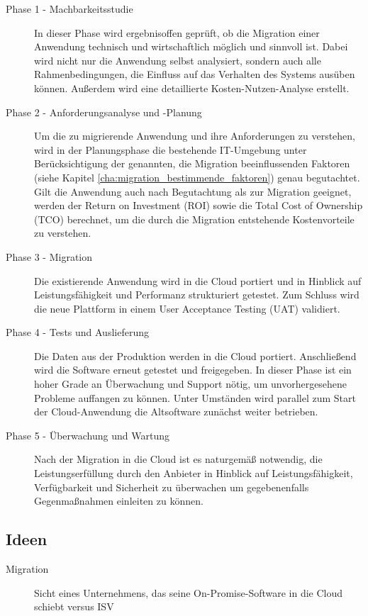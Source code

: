 \begin{description}
	\item[Phase 1 - Machbarkeitsstudie] In dieser Phase wird ergebnisoffen 
geprüft, ob die Migration einer Anwendung technisch und wirtschaftlich möglich 
und sinnvoll ist. Dabei wird nicht nur die Anwendung selbst analysiert, sondern 
auch alle Rahmenbedingungen, die Einfluss auf das Verhalten des Systems ausüben 
können. Außerdem wird eine detaillierte Kosten-Nutzen-Analyse erstellt.	

	\item[Phase 2 - Anforderungsanalyse und -Planung] Um die zu migrierende 
Anwendung und ihre Anforderungen zu verstehen, wird in der Planungsphase die 
bestehende IT-Umgebung unter Berücksichtigung der genannten, die Migration 
beeinflussenden Faktoren (siehe  Kapitel 
\ref{cha:migration_bestimmende_faktoren}) 
genau begutachtet. Gilt die Anwendung auch nach Begutachtung als zur Migration 
geeignet, werden der Return on Investment (ROI) sowie die Total Cost of 
Ownership (TCO) berechnet, um die durch die Migration entstehende 
Kostenvorteile 
zu verstehen.
	
	\item[Phase 3 - Migration] Die existierende Anwendung wird in die Cloud 
portiert und in Hinblick auf Leistungsfähigkeit und Performanz strukturiert 
getestet. Zum Schluss wird die neue Plattform in einem User Acceptance Testing 
(UAT) validiert. 
	
	\item[Phase 4 - Tests und Auslieferung] Die Daten aus der Produktion 
werden in die Cloud portiert. Anschließend wird die Software erneut getestet 
und freigegeben. In dieser Phase ist ein hoher Grade an Überwachung und Support 
nötig, um unvorhergesehene Probleme auffangen zu können. Unter Umständen wird 
parallel zum Start der Cloud-Anwendung die Altsoftware zunächst weiter 
betrieben.

	\item[Phase 5 - Überwachung und Wartung] Nach der Migration in die 
Cloud ist es naturgemäß notwendig, die Leistungserfüllung durch den Anbieter in 
Hinblick auf Leistungsfähigkeit, Verfügbarkeit und Sicherheit zu überwachen um 
gegebenenfalls Gegenmaßnahmen einleiten zu können.
\end{description}


\subsection{Ideen}
\begin{description}
	\item[Migration] Sicht eines Unternehmens, das seine 
On-Promise-Software in die Cloud schiebt versus ISV
\end{description}


